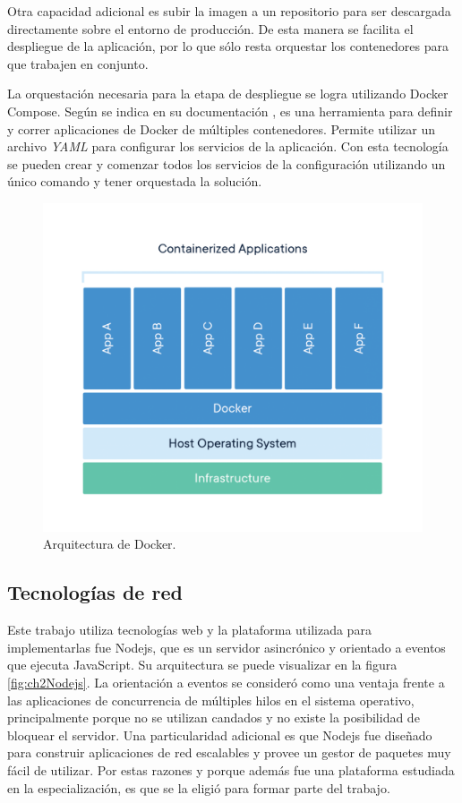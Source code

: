 Otra capacidad adicional es subir la imagen a un repositorio para ser descargada directamente sobre el entorno de producción.
De esta manera se facilita el despliegue de la aplicación, por lo que sólo resta orquestar los contenedores para que trabajen en conjunto. 

La orquestación necesaria para la etapa de despliegue se logra utilizando Docker Compose.
Según se indica en su documentación \citep{WEBSITE:WhatDockerCompose}, es una herramienta para definir y correr aplicaciones de Docker de múltiples contenedores.
Permite utilizar un archivo \emph{YAML} para configurar los servicios de la aplicación.
Con esta tecnología se pueden crear y comenzar todos los servicios de la configuración utilizando un único comando y tener orquestada la solución.

\begin{figure}[h]
	\centering
	\includegraphics[width=\textwidth]{./Figures/ch2DockerContainer.png}
	\caption{Arquitectura de Docker. \citep{WEBSITE:WhatContainer}}
	\label{fig:ch2WhatContainer}
\end{figure}

\subsection{Tecnologías de red}
Este trabajo utiliza tecnologías web y la plataforma utilizada para implementarlas fue Nodejs, que es un servidor asincrónico y orientado a eventos que ejecuta JavaScript.
Su arquitectura se puede visualizar en la figura \ref{fig:ch2Nodejs}.
La orientación a eventos se consideró como una ventaja frente a las aplicaciones de concurrencia de múltiples hilos en el sistema operativo, principalmente porque no se utilizan candados y no existe la posibilidad de bloquear el servidor.
Una particularidad adicional es que Nodejs fue diseñado para construir aplicaciones de red escalables y provee un gestor de paquetes muy fácil de utilizar.
Por estas razones y porque además fue una plataforma estudiada en la especialización, es que se la eligió para formar parte del trabajo.

